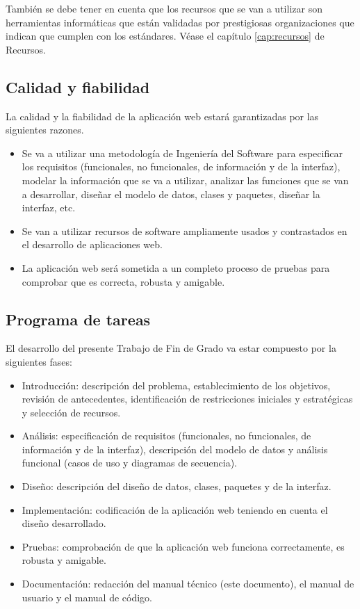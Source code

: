  También se debe tener en cuenta que los recursos  que se van a utilizar son herramientas informáticas que están validadas por prestigiosas organizaciones que indican que cumplen con los estándares. Véase el capítulo \ref{cap:recursos} de Recursos. 

\subsection{Calidad y fiabilidad}

 La calidad y la fiabilidad de la aplicación web estará garantizadas por las siguientes razones.
 \begin{itemize}
     \item Se va a utilizar una metodología de Ingeniería del Software para especificar los requisitos (funcionales, no funcionales, de información y de la interfaz), modelar la información que se va a utilizar, analizar las funciones que se van a desarrollar, diseñar el modelo de datos, clases y paquetes, diseñar la interfaz, etc. 
     \item Se van a utilizar recursos de software ampliamente usados y contrastados en el desarrollo de aplicaciones web.
     \item La aplicación web será sometida a un completo proceso de pruebas para comprobar que es correcta, robusta y amigable.
 \end{itemize}

\subsection{Programa de tareas}

 El desarrollo del presente Trabajo de Fin de Grado va estar compuesto por la siguientes fases:
 \begin{itemize}
     \item Introducción: descripción del problema, establecimiento de los objetivos, revisión de antecedentes, identificación de restricciones iniciales y estratégicas y selección de recursos.
     \item Análisis: especificación de requisitos (funcionales, no funcionales, de información y de la interfaz), descripción del modelo de datos y análisis funcional (casos de uso y diagramas de secuencia).
    
     \item Diseño: descripción del diseño de datos, clases, paquetes y de la interfaz.
    
     \item Implementación: codificación de la aplicación web teniendo en cuenta el diseño desarrollado.
    
     \item Pruebas: comprobación de que la aplicación web funciona correctamente, es robusta y amigable.
    
     \item Documentación: redacción del manual técnico (este documento), el manual de usuario y el manual de código.
 \end{itemize}


